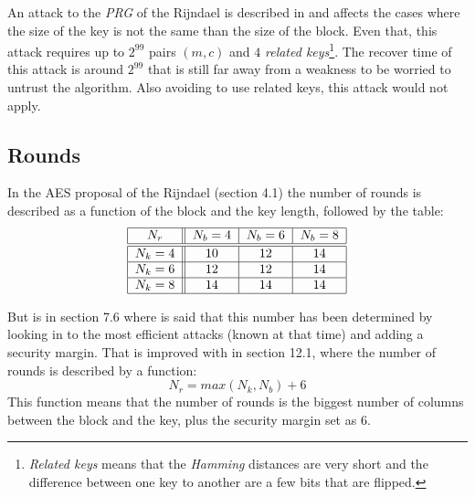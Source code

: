 \documentclass[10pt,a4paper,twoside]{llncs}
\begin{document}
An attack to the \emph{PRG} of the Rijndael is described in \cite{fullaes-192-256} and affects the cases where the size of the key is not the same than the size of the block. Even that, this attack requires up to $2^{99}$ pairs $(m,c)$ and $4$ \emph{related keys}\footnote{\emph{Related keys} means that the \emph{Hamming} distances are very short and the difference between one key to another are a few bits that are flipped.}. The recover time of this attack is around $2^{99}$ that is still far away from a weakness to be worried to untrust the algorithm. Also avoiding to use related keys, this attack would not apply.

\subsection{Rounds}\label{sec:rounds}

In the AES proposal of the Rijndael \cite{Daemen01aes-ammended} (section 4.1) the number of rounds is described as a function of the block and the key length, followed by the table:
\begin{equation}\label{tab:nrounds}
\begin{tabular}{|c||c|c|c|}
\hline
$N_r$     & $N_b = 4$ & $N_b = 6$ & $N_b = 8$ \\ \hline\hline
$N_k = 4$ &    $10$   &    $12$   &    $14$   \\ \hline
$N_k = 6$ &    $12$   &    $12$   &    $14$   \\ \hline
$N_k = 8$ &    $14$   &    $14$   &    $14$   \\ \hline
\end{tabular}
\end{equation}

 But is in section 7.6 where is said that this number has been determined by looking in to the most efficient attacks (known at that time) and adding a security margin. That is improved with in section 12.1, where the number of rounds is described by a function:
\begin{equation}\label{eq:nrounds}
 N_r = max(N_k,N_b)+6
\end{equation}
This function means that the number of rounds is the biggest number of columns between the block and the key, plus the security margin set as $6$.
\end{document}
